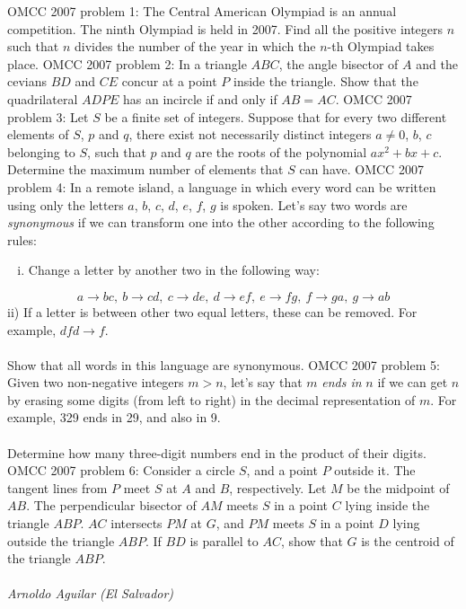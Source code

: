 OMCC 2007 problem 1:  The Central American Olympiad is an annual competition. The ninth Olympiad is held in 2007. Find all the positive integers $n$ such that $n$ divides the number of the year in which the $n$-th Olympiad takes place. 
OMCC 2007 problem 2:  In a triangle $ABC$, the angle bisector of $A$ and the cevians $BD$ and $CE$ concur at a point $P$ inside the triangle. Show that the quadrilateral $ADPE$ has an incircle if and only if $AB=AC$. 
OMCC 2007 problem 3:  Let $S$ be a finite set of integers. Suppose that for every two different elements of $S$, $p$ and $q$, there exist not necessarily distinct integers $a \neq 0$, $b$, $c$ belonging to $S$, such that $p$ and $q$ are the roots of the polynomial $ax^2+bx+c$. Determine the maximum number of elements that $S$ can have. 
OMCC 2007 problem 4:  In a remote island, a language in which every word can be written using only the letters $a$, $b$, $c$, $d$, $e$, $f$, $g$ is spoken. Let's say two words are \textit{synonymous} if we can transform one into the other according to the following rules:
\begin{enumerate}[i)]
  \item Change a letter by another two in the following way:
\end{enumerate}
\[
a \rightarrow bc,\ b \rightarrow cd,\ c \rightarrow de,\ d \rightarrow ef,\ e \rightarrow fg,\ f\rightarrow ga,\ g\rightarrow ab
\]
ii) If a letter is between other two equal letters, these can be removed. For example, $dfd \rightarrow f$. \\\\
Show that all words in this language are synonymous. 
OMCC 2007 problem 5:  Given two non-negative integers $m>n$, let's say that $m$ \textit{ends in} $n$ if we can get $n$ by erasing some digits (from left to right) in the decimal representation of $m$. For example, 329 ends in 29, and also in 9. \\\\
Determine how many three-digit numbers end in the product of their digits. 
OMCC 2007 problem 6:  Consider a circle $S$, and a point $P$ outside it. The tangent lines from $P$ meet $S$ at $A$ and $B$, respectively. Let $M$ be the midpoint of $AB$. The perpendicular bisector of $AM$ meets $S$ in a point $C$ lying inside the triangle $ABP$. $AC$ intersects $PM$ at $G$, and $PM$ meets $S$ in a point $D$ lying outside the triangle $ABP$. If $BD$ is parallel to $AC$, show that $G$ is the centroid of the triangle $ABP$. \\\\
\textit{Arnoldo Aguilar (El Salvador)} 

